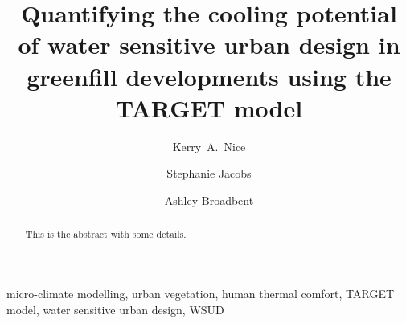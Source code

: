 \documentclass[final,3p,times,authoryear]{elsarticle}
\begin{document}
 


\begin{frontmatter}



\title{Quantifying the cooling potential of water sensitive urban design in greenfill developments using the TARGET model}




\author[melb,monash,crc]{Kerry~A.~Nice}
\author[monash,crc,Mosiac]{Stephanie Jacobs}
\author[az1,az2,monash,crc]{Ashley Broadbent}



\address[melb]{Transport, Health, and Urban Design Hub, Faculty of Architecture, Building, and Planning, University of Melbourne, Victoria 3010, Australia}
\address[monash]{School of Earth, Atmosphere and Environment, Monash University, Clayton, VIC 3800, Australia}
\address[az1]{School of Geographical Sciences and Urban Planning, Arizona State University, Tempe, Arizona, USA}
\address[az2]{Urban Climate Research Center, Arizona State University, Tempe, Arizona, USA}
\address[crc]{Cooperative Research Centre for Water Sensitive Cities, Melbourne, Australia}
\address[Mosiac]{Mosiac Insights, Melbourne, Australia}





\begin{abstract}

This is the abstract with some details.

\end{abstract}

\begin{keyword}
micro-climate modelling, urban vegetation, human thermal comfort, TARGET model, water sensitive urban design, WSUD



\end{keyword}

\end{frontmatter}
\end{document}
